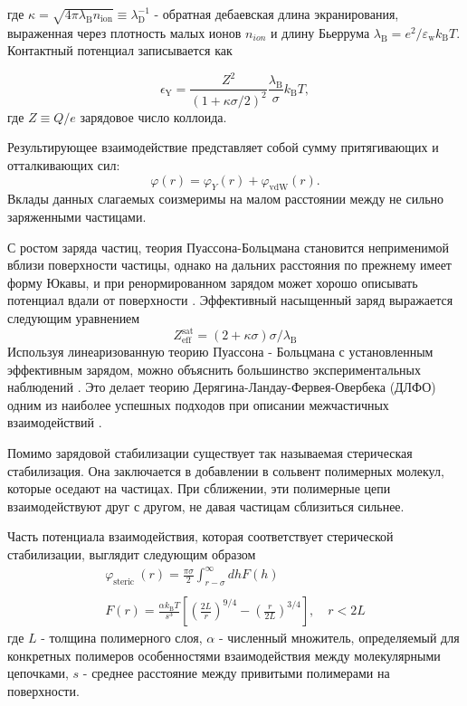 где $\kappa=\sqrt{4 \pi \lambda_{\mathrm{B}} n_{\mathrm{ion}}} \equiv \lambda_{\mathrm{D}}^{-1}$ - обратная дебаевская длина экранирования, выраженная через плотность малых ионов $n_{ion}$ и длину Бьеррума $\lambda_{\mathrm{B}}=e^{2} / \varepsilon_{\mathrm{w}} k_{\mathrm{B}} T$. Контактный потенциал записывается как 

\begin{equation}
\epsilon_{\mathrm{Y}}=\frac{Z^{2}}{(1+\kappa \sigma / 2)^{2}} \frac{\lambda_{\mathrm{B}}}{\sigma} k_{\mathrm{B}} T,
\end{equation}
где $Z \equiv Q / e$ зарядовое число коллоида.

Результирующее взаимодействие представляет собой сумму притягивающих и отталкивающих сил:
\begin{equation}
\varphi(r)=\varphi_{Y}(r)+\varphi_{\mathrm{vdW}}(r).
\end{equation}
Вклады данных слагаемых соизмеримы на малом расстоянии между не сильно заряженными частицами.

С ростом заряда частиц, теория Пуассона-Больцмана становится неприменимой вблизи поверхности частицы, однако на дальних расстояния по прежнему имеет форму Юкавы, и при ренормированном зарядом может хорошо описывать потенциал вдали от поверхности \cite{Yur55}. Эффективный насыщенный заряд выражается следующим уравнением \cite{Yur56}
\begin{equation}
Z_{\mathrm{eff}}^{\mathrm{sat}}=(2+\kappa \sigma) \sigma / \lambda_{\mathrm{B}}
\end{equation}
Используя линеаризованную теорию Пуассона - Больцмана с установленным эффективным зарядом, можно объяснить большинство экспериментальных наблюдений \cite{Yur57, Yur58, Yur59}. Это делает теорию Дерягина-Ландау-Фервея-Овербека (ДЛФО) одним из наиболее успешных подходов при описании межчастичных взаимодействий \cite{Yur49, Yur60, Yur61}. 

Помимо зарядовой стабилизации существует так называемая стерическая стабилизация. Она заключается в добавлении в сольвент полимерных молекул, которые оседают на частицах. При сближении, эти полимерные цепи взаимодействуют друг с другом, не давая частицам сблизиться сильнее. 

Часть потенциала взаимодействия, которая соответствует стерической стабилизации, выглядит следующим образом \cite{Yur31}
\begin{equation}
\begin{array}{l}
\varphi_{\text {steric }}(r)=\frac{\pi \sigma}{2} \int_{r-\sigma}^{\infty} d h F(h) \\
\\
F(r)=\frac{\alpha k_{\mathrm{B}} T}{s^{3}}\left[\left(\frac{2 L}{r}\right)^{9 / 4}-\left(\frac{r}{2 L}\right)^{3 / 4}\right], \quad r<2 L
\end{array}
\label{eqStericStabl}
\end{equation}
где $L$ - толщина полимерного слоя, $\alpha$ - численный множитель, определяемый для конкретных полимеров
особенностями взаимодействия между молекулярными цепочками, $s$ - среднее расстояние между привитыми полимерами на поверхности.

